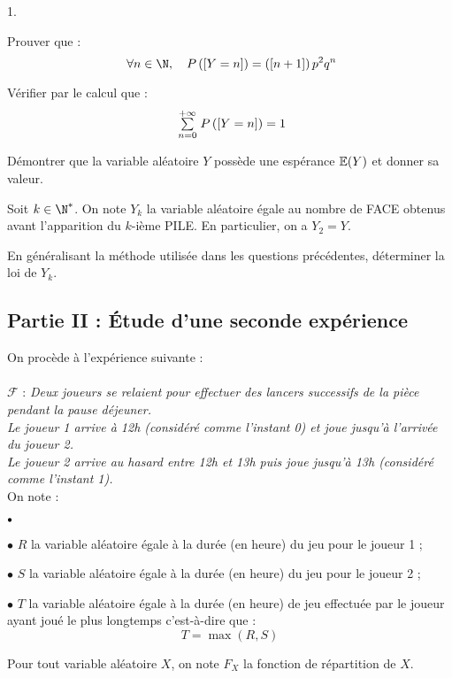 \documentclass[11pt]{article}%
\begin{document}
\begin{noliste}{1.}
\item Prouver que :
\[
 \ \forall n\in \N,\quad P\left(\Ev{Y = n}\right) = \left(\Ev{n +
1}\right)p^{2}q^{n} 
\]

\item Vérifier par le calcul que :
\[
 \ {\textstyle\sum\limits_{n = 0}^{+ \infty}}\hspace{.1cm} P\left(\left[ {Y = n} \right]\right) = 1 
\]

\item Démontrer que la variable aléatoire $Y$ possède une espérance
$\mathbb{E}(Y)$ et donner sa valeur.

\item Soit $k\in\N^*$. On note $Y_{k}$ la variable aléatoire égale au
nombre de FACE obtenus avant l'apparition du $k$-ième PILE. En
particulier, on a $Y_{2} = Y$.

En généralisant la méthode utilisée dans les questions précédentes,
déterminer la loi de $Y_{k}$.
\end{noliste}

\subsection*{Partie II : Étude d'une seconde expérience}

\noindent On procède à l'expérience suivante : \\
\\
\noindent $\mathcal{F}$ : \og \textit{Deux joueurs se relaient pour
effectuer des lancers successifs de la pièce pendant la pause déjeuner.
\\
Le joueur 1 arrive à 12h (considéré comme l'instant 0) et joue jusqu'à
l'arrivée du joueur 2. \\
 Le joueur 2 arrive au hasard entre 12h et 13h puis joue jusqu'à 13h
(considéré comme l'instant 1).} \fg\\

\noindent On note :
\begin{noliste}{$\scriptstyle \bullet$}
\item[$\bullet$] $R$ la variable aléatoire égale à la durée (en heure)
du jeu pour le joueur 1 ;
\item[$\bullet$] $S$ la variable aléatoire égale à la durée (en heure)
du jeu pour le joueur 2 ;
\item[$\bullet$] $T$ la variable aléatoire égale à la durée (en heure)
de jeu effectuée par le joueur ayant joué le plus longtemps
c'est-à-dire que : 
\[
 T = \max(R,S) 
\]
\end{noliste}

\noindent Pour tout variable aléatoire $X$, on note $F_{X}$ la fonction
de répartition de $X$.\\
\end{document}

